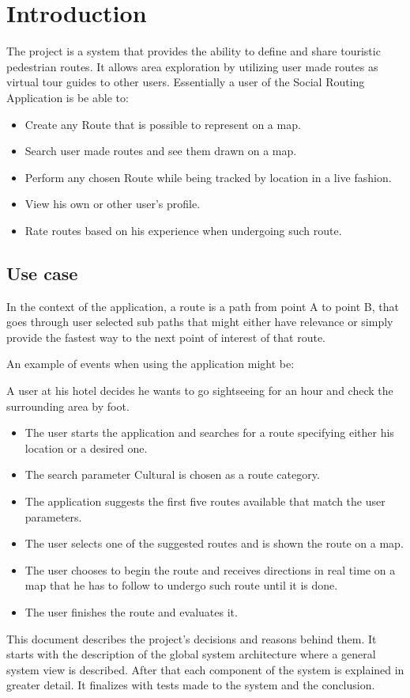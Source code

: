 \chapter{Introduction}

    The project is a system that provides the ability to define and share touristic pedestrian routes. It allows
    area exploration by utilizing user made routes as virtual tour guides to other users. 
    Essentially a user of the Social Routing Application is be able to:
    \begin{itemize}
        \item Create any Route that is possible to represent on a map.
        \item Search user made routes and see them drawn on a map.
        \item Perform any chosen Route while being tracked by location in a live fashion.
        \item View his own or other user's profile.
        \item Rate routes based on his experience when undergoing such route.
    \end{itemize}

    \section*{Use case}
        In the context of the application, a route is a path from point A to point B, that goes through user selected sub paths
        that might either have relevance or simply provide the fastest way to the next point of interest of that route. 

        An example of events when using the application might be:

        A user at his hotel decides he wants to go sightseeing for an hour and check the surrounding area by foot.
        \begin{itemize}  
            \item The user starts the application and searches for a route specifying either his location or a desired one.
            \item The search parameter Cultural is chosen as a route category.
            \item The application suggests the first five routes available that match the user parameters. 
            \item The user selects one of the suggested routes and is shown the route on a map.
            \item The user chooses to begin the route and receives directions in real time on a map that he has to follow to undergo such route until it is done.
            \item The user finishes the route and evaluates it. 
        \end{itemize}
        
    \noindent
    This document describes the project's decisions and reasons behind them. It starts with
    the description of the global system architecture where a general system view is described.
    After that each component of the system is explained in greater detail. 
    It finalizes with tests made to the system and the conclusion.